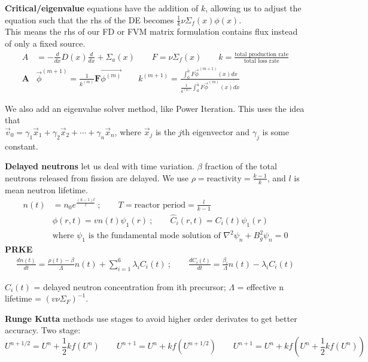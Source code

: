 \documentclass[12pt]{article}
\newcommand{\ve}[1]{\ensuremath{\mathbf{#1}}}
\begin{document}
\textbf{Critical/eigenvalue} equations have the addition of $k$, allowing us to adjust the equation such that the rhs of the DE becomes $\frac{1}{k}\nu \Sigma_f(x) \phi(x)$. \\
This means the rhs of our FD or FVM matrix formulation contains flux instead of only a fixed source. 
\vspace*{-1.25em}
\begin{align*}
A &= -\frac{d}{dx}D(x)\frac{d}{dx} + \Sigma_a(x) \qquad F = \nu\Sigma_f(x) \qquad k = \frac{\text{total production rate}}{\text{total loss rate}}\\
%
\ve{A} &\vec{\phi}^{(m+1)} = \frac{1}{k^{(m)}}\ve{F}\vec{\phi^{(m)}} \qquad 
k^{(m+1)} = \frac{\int_0^{\tilde{a}} F \vec{\phi}^{(m+1)}(x)dx}{\frac{1}{k^{(m)}}\int_0^{\tilde{a}} F \vec{\phi}^{(m)}(x)dx}
\end{align*}

\vspace*{-1.5em}
We also add an eigenvalue solver method, like Power Iteration. This uses the idea that \\$\vec{v}_0 = \gamma_1 \vec{x}_1 + \gamma_2 \vec{x}_2 + \cdots + \gamma_n \vec{x}_n$, where $\vec{x}_{j}$ is the $j$th eigenvector and $\gamma_{j}$ is some constant.

\textbf{Delayed neutrons} let us deal with time variation. $\beta$ fraction of the total neutrons released from fission are delayed. We use $\rho =\mbox{reactivity} = \frac{k-1}{k}$, and $l$ is mean neutron lifetime. 
\begin{align*}
  n(t) &= n_0e^{\frac{(k-1)t}{l}}\:; \qquad T = \text{reactor period} = \frac{l}{k-1}\\
  &\phi(r,t) = vn(t)\psi_1(r)\:; \qquad
  \hat{C}_i(r,t) = C_i(t)\psi_1(r)\\
  &\text{where $\psi_1$ is the fundamental mode solution of }   \nabla^2\psi_n + B_g^2\psi_n = 0%
\end{align*}
\textbf{PRKE}
\vspace*{-1em}
\begin{align*}
  \frac{dn(t)}{dt} = \frac{\rho(t)-\beta}{\Lambda}n(t) + \sum_{i=1}^{6}\lambda_iC_i(t) \:; \qquad
  \frac{dC_i(t)}{dt} = \frac{\beta_i}{\Lambda}n(t) - \lambda_i C_i(t)
 \end{align*}
 
 \vspace*{-1.5em}
$C_i(t)$ = delayed neutron concentration from ith precursor; $\Lambda$ = effective n lifetime = $(v\nu\Sigma_F)^{-1}$.

\textbf{Runge Kutta} methods use stages to avoid higher order derivates to get better accuracy. Two stage:
\vspace*{-.5em}
\[U^{n+1/2} = U^n + \frac{1}{2}kf(U^n)\qquad U^{n+1} = U^n + kf(U^{n+1/2}) \qquad U^{n+1} = U^n + kf(U^n + \frac{1}{2}kf(U^n))\]
\end{document}
